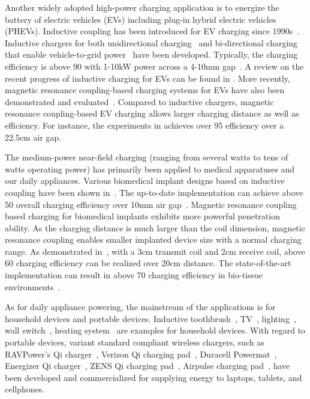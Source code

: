 \documentclass[twocolumn,10pt]{IEEEtran}
\begin{document}
Another widely adopted high-power charging application is to energize the battery of electric vehicles (EVs) including plug-in hybrid electric vehicles (PHEVs). Inductive coupling has been introduced for EV charging since 1990s~\cite{G.1999Hayes,R.1996Severns}. Inductive chargers for both unidirectional charging~\cite{H.2012Wu,G.2007Egan,N.2015Liu} and bi-directional charging \cite{K.2011Madawala,C.2015Kisacikoglu} that enable vehicle-to-grid power~\cite{W.2013Zhou} have been developed. Typically, the charging efficiency is above 90 with 1-10kW power across a 4-10mm gap~\cite{A.2013Covic}.
A review on the recent progress of inductive charging for EVs can be found in \cite{H.2011Wureview}. More recently, magnetic resonance coupling-based charging systems for EVs have also been demonstrated and evaluated~\cite{H.Kim2014,W.2014Khan-ngern,Di2012Tommaso,X.2013Wang,S.2012Krishnan}. Compared to inductive chargers, magnetic resonance coupling-based EV charging allows larger charging distance as well as efficiency. For instance, the experiments in \cite{H.Kim2014} achieves over 95 efficiency over a 22.5cm air gap. 

The medium-power near-field charging (ranging from several watts to tens of watts operating power) has primarily been applied to medical apparatuses and our daily appliances. 
Various biomedical implant designs based on inductive coupling have been shown in~\cite{H.2010Jiang,H.2013Jiang,A.2012Arshad,K.2013RamRakhyani,K.2012RamRakhyani}. The up-to-date implementation can achieve above 50 overall charging efficiency over 10mm air gap~\cite{H.2013Jiang}. Magnetic resonance coupling based charging for biomedical implants \cite{K.2011RamRakhyani,F.2013Xue,Q.2013Xu,A.2014Qusba,G.2012Yilmaz,D.2014Ahn} exhibits more powerful penetration ability. As the charging distance is much larger than the coil dimension, magnetic resonance coupling enables smaller implanted device size with a normal charging range. As demonstrated in~\cite{D.2014Ahn}, with a 3cm transmit coil and 2cm receive coil, above 60 charging efficiency can be realized over 20cm distance. The state-of-the-art implementation can result in above 70 charging efficiency in bio-tissue environments~\cite{G.2012Yilmaz}. 

As for daily appliance powering, the mainstream of the applications is for household devices and portable devices. Inductive toothbrush~\cite{M.2004Stratmann}, TV~\cite{J.2012Kim}, lighting~\cite{S.2011Rajagopal,W.2004Baarman}, wall switch~\cite{A.1993Johnson}, heating system~\cite{Y.2014Xu} are examples for household devices. With regard to portable devices, variant standard compliant wireless chargers, such as  RAVPower's Qi charger~\cite{RAVPower}, Verizon Qi charging pad~\cite{verizonwireless}, Duracell Powermat~\cite{Duracell2011}, Energizer Qi charger~\cite{Energizer}, ZENS Qi charging pad~\cite{zens}, Airpulse charging pad~\cite{bitmore}, have been developed and commercialized for supplying energy to laptops, tablets, and cellphones.
\end{document}
